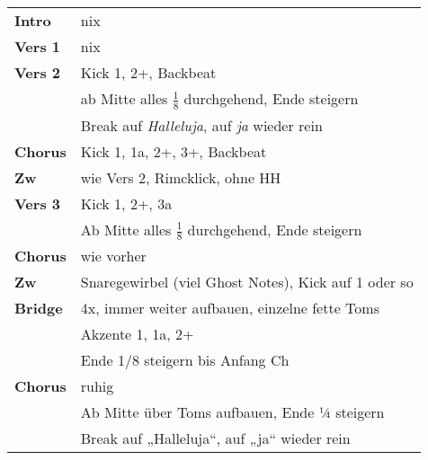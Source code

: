 
\begin{tabular}{p{1.6cm}l}
	\textbf{Intro}  & nix                                                       \\
	\textbf{Vers 1} & nix                                                       \\
	\textbf{Vers 2} & Kick 1, 2+, Backbeat                                      \\
	                & ab Mitte alles $\frac{1}{8}$ durchgehend, Ende steigern   \\
	                & Break auf \textit{Halleluja}, auf \textit{ja} wieder rein \\
	\textbf{Chorus} & Kick 1, 1a, 2+, 3+, Backbeat                              \\
	\textbf{Zw}     & wie Vers 2, Rimcklick, ohne HH                            \\
	\textbf{Vers 3} & Kick 1, 2+, 3a                                            \\
	                & Ab Mitte alles $\frac{1}{8}$ durchgehend, Ende steigern   \\
	\textbf{Chorus} & wie vorher                                                \\
	\textbf{Zw}     & Snaregewirbel (viel Ghost Notes), Kick auf 1 oder so      \\
	\textbf{Bridge} & 4x, immer weiter aufbauen, einzelne fette Toms            \\
	                & Akzente 1, 1a, 2+                                         \\
	                & Ende 1/8 steigern bis Anfang Ch                           \\
	\textbf{Chorus} & ruhig                                                     \\
	                & Ab Mitte über Toms aufbauen, Ende ¼ steigern              \\
	                & Break auf „Halleluja“, auf „ja“ wieder rein               \\
\end{tabular}
